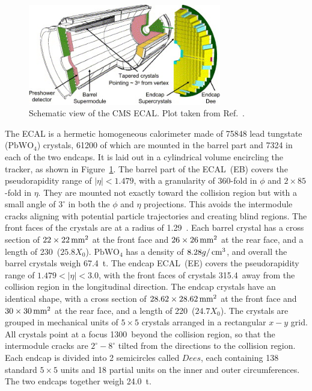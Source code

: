 \begin{figure}[!htb]
    \centering
    \captionsetup{justification=centering}
    \includegraphics[width=0.75\textwidth]{pics/LHC_CMS/ECAL.jpg}
    \caption{Schematic view of the CMS ECAL.
             Plot taken from Ref.~\cite{BROWN200729}.}
    \label{fig:cms_ecal}
\end{figure}

The ECAL is a hermetic homogeneous calorimeter made of 75848 lead tungstate ($\text{PbWO}_{4}$) crystals,
61200 of which are mounted in the barrel part and 7324 in each of the two endcaps.
It is laid out in a cylindrical volume encircling the tracker, as shown in Figure~\ref{fig:cms_ecal}. 
The barrel part of the ECAL~(EB) covers the pseudorapidity range of $|\eta| < 1.479$, 
with a granularity of 360-fold in $\phi$ and $2 \times 85$-fold in $\eta$.
They are mounted not exactly toward the collision region but with a small angle of $3^{\circ}$ in both the $\phi$ and $\eta$ projections.
This avoids the intermodule cracks aligning with potential particle trajectories and creating blind regions.
The front faces of the crystals are at a radius of 1.29~\meter.
Each barrel crystal has a cross section of $22 \times 22 \,\text{mm}^{2}$ at the front face and $26 \times 26 \,\text{mm}^{2}$ at the rear face, and a length of 230~\mm ($25.8 X_{0}$). 
$\text{PbWO}_{4}$ has a density of $8.28 g/\,\text{cm}^{3}$, and overall the barrel crystals weigh 67.4~t.
The endcap ECAL~(EE) covers the pseudorapidity range of $1.479 < |\eta| < 3.0$,
with the front faces of crystals 315.4~\cm away from the collision region in the longitudinal direction. 
The endcap crystals have an identical shape, with a cross section of $28.62 \times 28.62 \,\text{mm}^{2}$ at the front face and $30 \times 30 \,\text{mm}^{2}$ at the rear face, and a length of 220~\mm ($24.7 X_{0}$).
The crystals are grouped in mechanical units of $5 \times 5$ crystals arranged in a rectangular $x-y$ grid.
All crystals point at a focus 1300~\mm beyond the collision region, 
so that the intermodule cracks are $2^{\circ} - 8^{\circ}$ tilted from the directions to the collision region.
Each endcap is divided into 2 semicircles called $Dees$, each containing 138 standard $5 \times 5$ units and 18 partial units on the inner and outer circumferences.
The two endcaps together weigh 24.0~t.

